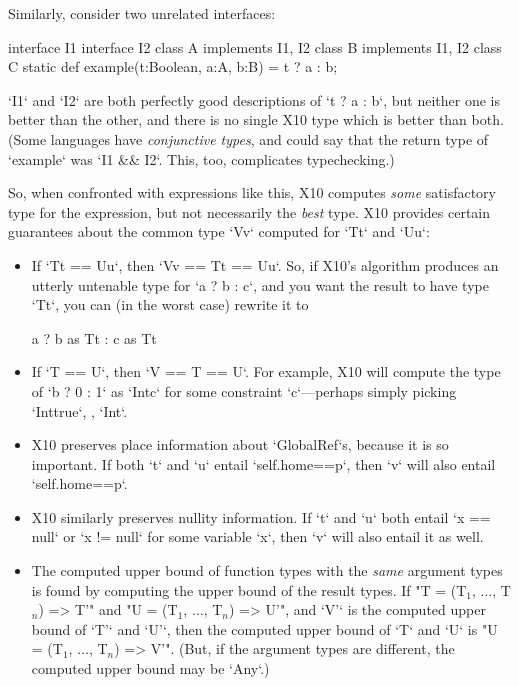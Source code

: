 Similarly, consider two unrelated interfaces: 
\begin{xten}
interface I1 {}
interface I2 {}
class A implements I1, I2 {}
class B implements I1, I2 {}
class C {
  static def example(t:Boolean, a:A, b:B) = t ? a : b;
}
\end{xten}
%
\xcd`I1` and \xcd`I2` are both perfectly good descriptions of \xcd`t ? a : b`, 
but neither one is better than the other, and there is no single X10 type
which is better than both. (Some languages have {\em conjunctive
    types}, and could say that the return type of \xcd`example` was 
\xcd`I1 && I2`.  This, too, complicates typechecking.)


So, when confronted with expressions like this, X10 computes {\em some}
satisfactory type for the expression, but not necessarily the {\em best} type.  
X10 provides certain guarantees about the common type \xcd`V{v}` computed for 
\xcd`T{t}` and \xcd`U{u}`: 
\begin{itemize}
\item If \xcd`T{t} == U{u}`, then \xcd`V{v} == T{t} == U{u}`.  So, if X10's
      algorithm produces an utterly untenable type for \xcd`a ? b : c`, and
      you want the result to have type \xcd`T{t}`, you can 
      (in the worst case) rewrite it to 
\begin{xtenmath}
a ? b as T{t} : c as T{t}
\end{xtenmath}
\item If \xcd`T == U`, then \xcd`V == T == U`.  For example, 
      X10 will compute the type of \xcd`b ? 0 : 1` as 
      \xcd`Int{c}` for some constraint \xcd`c`---perhaps simply 
      picking \xcd`Int{true}`, \viz, \xcd`Int`. 
\item X10 preserves place information about \xcd`GlobalRef`s, because it is so important. If both
      \xcd`t` and \xcd`u` entail \xcd`self.home==p`, then  
      \xcd`v` will also entail \xcd`self.home==p`.  
\item X10 similarly preserves nullity information.  If \xcd`t` and \xcd`u`
      both entail \xcd`x == null` or \xcd`x != null` for some variable
      \xcd`x`, then \xcd`v` will also entail it as well.

\item The computed upper bound of function types with the {\em same} argument
      types is found by computing the upper bound of the result types.  
      If 
      \xcdmath"T = (T$_1$, $\ldots$, T$_n$) => T'"
      and 
      \xcdmath"U = (T$_1$, $\ldots$, T$_n$) => U'", 
      and \xcd`V'` is the computed upper bound of \xcd`T'` and \xcd`U'`, 
      then the computed upper bound of \xcd`T` and \xcd`U` is 
      \xcdmath"U = (T$_1$, $\ldots$, T$_n$) => V'".
      (But, if the argument types are different, the computed upper bound may
      be \xcd`Any`.)

\end{itemize}

